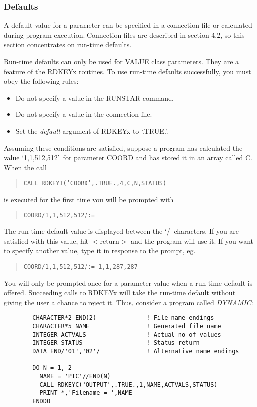 \subsubsection {Defaults}
A default value for a parameter can be specified in a connection file or
calculated during program execution.
Connection files are described in section 4.2, so this section concentrates
on run-time defaults.

Run-time defaults can only be used for VALUE class parameters.
They are a feature of the RDKEYx routines.
To use run-time defaults successfully, you must obey the following rules:
\begin{itemize}
\item Do not specify a value in the RUNSTAR command.
\item Do not specify a value in the connection file.
\item Set the {\em default} argument of RDKEYx to `.TRUE.'.
\end{itemize}
Assuming these conditions are satisfied,
suppose a program has calculated the value `1,1,512,512'\ for parameter
COORD and has stored it in an array called C.
When the call
\begin{quote}
{\tt CALL RDKEYI('COORD',.TRUE.,4,C,N,STATUS)}
\end{quote}
is executed for the first time you will be prompted with
\begin{quote}
{\tt COORD/1,1,512,512/:=}
\end{quote}
The run time default value is displayed between the `/' characters.
If you are satisfied with this value, hit $<$return$>$ and the program will use it.
If you want to specify another value, type it in response to the prompt, eg.
\begin{quote}
{\tt COORD/1,1,512,512/:= 1,1,287,287}
\end{quote}
You will only be prompted once for a parameter value when a run-time default
is offered.
Succeeding calls to RDKEYx will take the run-time default without giving the
user a chance to reject it.
Thus, consider a program called {\em DYNAMIC}:
\begin{verbatim}
        CHARACTER*2 END(2)              ! File name endings
        CHARACTER*5 NAME                ! Generated file name
        INTEGER ACTVALS                 ! Actual no of values
        INTEGER STATUS                  ! Status return
        DATA END/'01','02'/             ! Alternative name endings

        DO N = 1, 2
          NAME = 'PIC'//END(N)
          CALL RDKEYC('OUTPUT',.TRUE.,1,NAME,ACTVALS,STATUS)
          PRINT *,'Filename = ',NAME
        ENDDO
\end{verbatim}

